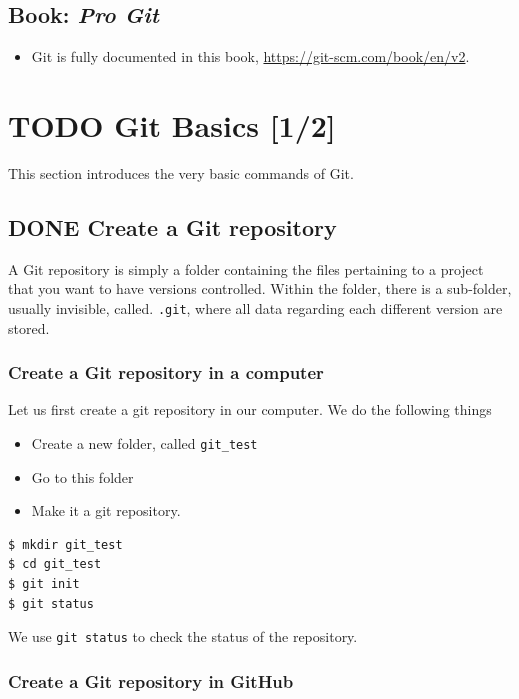 \documentclass[a4paper,11pt]{article}
\begin{document}
\subsection{Book: \emph{Pro Git}}
\label{sec:orgc775018}

\begin{itemize}
\item Git is fully documented in this book,
\url{https://git-scm.com/book/en/v2}.
\end{itemize}


\section{{\bfseries\sffamily TODO} Git Basics [1/2]}
\label{sec:org5f69744}

This section introduces the very basic commands of Git.

\subsection{{\bfseries\sffamily DONE} Create a Git repository}
\label{sec:org151593c}
A Git repository is simply a folder containing the files pertaining to
a project that you want to have versions controlled. Within the
folder, there is a sub-folder, usually invisible, called. \texttt{.git},
where all data regarding each different version are stored.

\subsubsection*{Create a Git repository in a computer}
\label{sec:orgf6c6725}

Let us first create a git repository in our computer. We do the
following things
\begin{itemize}
\item Create a new folder, called \texttt{git\_test}
\item Go to this folder
\item Make it a git repository.
\end{itemize}

\begin{verbatim}
$ mkdir git_test
$ cd git_test
$ git init
$ git status
\end{verbatim}

We use \texttt{git status} to check the status of the repository.

\subsubsection*{Create a Git repository in GitHub}
\label{sec:org6468ef4}
\end{document}
